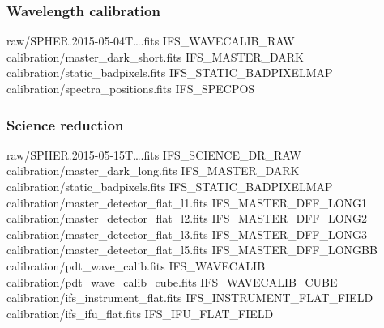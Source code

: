\documentclass[twoside,single]{lion-msc}
\begin{document}
\subsubsection*{Wavelength calibration}
\begin{mdframed}[linewidth = 0.3mm, linecolor = black]
raw/SPHER.2015-05-04T\dots.fits IFS\_WAVECALIB\_RAW\\
calibration/master\_dark\_short.fits IFS\_MASTER\_DARK\\
calibration/static\_badpixels.fits IFS\_STATIC\_BADPIXELMAP\\
calibration/spectra\_positions.fits IFS\_SPECPOS
\end{mdframed}

\subsubsection*{Science reduction}
\begin{mdframed}[linewidth = 0.3mm, linecolor = black]
raw/SPHER.2015-05-15T\dots.fits IFS\_SCIENCE\_DR\_RAW\\
calibration/master\_dark\_long.fits IFS\_MASTER\_DARK\\
calibration/static\_badpixels.fits IFS\_STATIC\_BADPIXELMAP\\
calibration/master\_detector\_flat\_l1.fits IFS\_MASTER\_DFF\_LONG1\\
calibration/master\_detector\_flat\_l2.fits IFS\_MASTER\_DFF\_LONG2\\
calibration/master\_detector\_flat\_l3.fits IFS\_MASTER\_DFF\_LONG3\\
calibration/master\_detector\_flat\_l5.fits IFS\_MASTER\_DFF\_LONGBB\\
calibration/pdt\_wave\_calib.fits IFS\_WAVECALIB\\
calibration/pdt\_wave\_calib\_cube.fits IFS\_WAVECALIB\_CUBE\\
calibration/ifs\_instrument\_flat.fits IFS\_INSTRUMENT\_FLAT\_FIELD\\
calibration/ifs\_ifu\_flat.fits IFS\_IFU\_FLAT\_FIELD
\end{mdframed}
\end{document}
